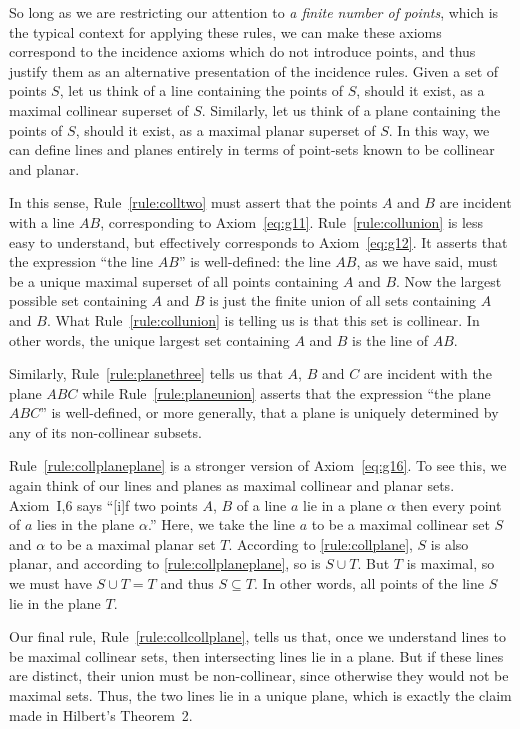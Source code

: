 So long as we are restricting our attention to \emph{a finite number of points}, which is the typical context for applying these rules, we can make these axioms correspond to the incidence axioms which do not introduce points, and thus justify them as an alternative presentation of the incidence rules. Given a set of points $S$, let us think of a line containing the points of $S$, should it exist, as a maximal collinear superset of $S$. Similarly, let us think of a plane containing the points of $S$, should it exist, as a maximal planar superset of $S$. In this way, we can define lines and planes entirely in terms of point-sets known to be collinear and planar. 

In this sense, Rule~\ref{rule:colltwo} must assert that the points $A$ and $B$ are incident with a line $AB$, corresponding to Axiom~\ref{eq:g11}. Rule~\ref{rule:collunion} is less easy to understand, but effectively corresponds to Axiom~\ref{eq:g12}. It asserts that the expression ``the line $AB$'' is well-defined: the line $AB$, as we have said, must be a unique maximal superset of all points containing $A$ and $B$. Now the largest possible set containing $A$ and $B$ is just the finite union of all sets containing $A$ and $B$. What Rule~\ref{rule:collunion} is telling us is that this set is collinear. In other words, the unique largest set containing $A$ and $B$ is the line of $AB$.

Similarly, Rule~\ref{rule:planethree} tells us that $A$, $B$ and $C$ are incident with the plane $ABC$ while Rule~\ref{rule:planeunion} asserts that the expression ``the plane $ABC$'' is well-defined, or more generally, that a plane is uniquely determined by any of its non-collinear subsets.

Rule~\ref{rule:collplaneplane} is a stronger version of Axiom~\ref{eq:g16}. To see this, we again think of our lines and planes as maximal collinear and planar sets. Axiom~I,6 says ``[i]f two points $A$, $B$ of a line $a$ lie in a plane $\alpha$ then every point of $a$ lies in the plane $\alpha$.'' Here, we take the line $a$ to be a maximal collinear set $S$ and $\alpha$ to be a maximal planar set $T$. According to \ref{rule:collplane}, $S$ is also planar, and according to \ref{rule:collplaneplane}, so is $S \cup T$. But $T$ is maximal, so we must have $S \cup T = T$ and thus $S \subseteq T$. In other words, all points of the line $S$ lie in the plane $T$.

Our final rule, Rule~\ref{rule:collcollplane}, tells us that, once we understand lines to be maximal collinear sets, then intersecting lines lie in a plane. But if these lines are distinct, their union must be non-collinear, since otherwise they would not be maximal sets. Thus, the two lines lie in a unique plane, which is exactly the claim made in Hilbert's Theorem~2. 

